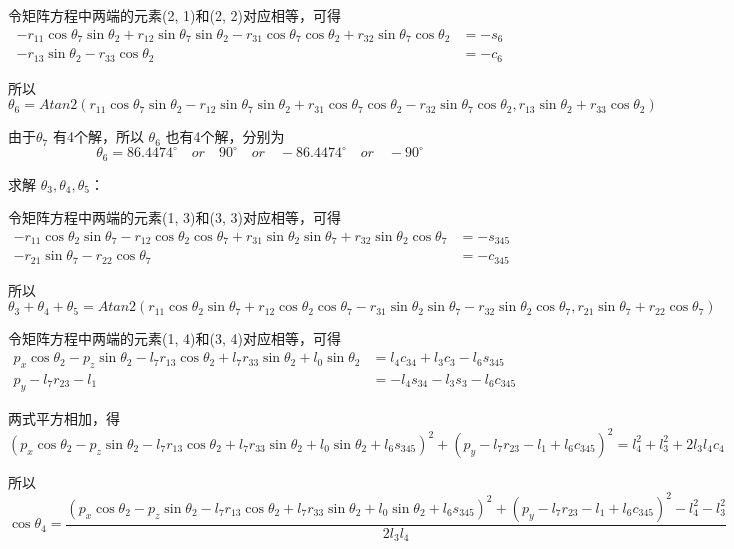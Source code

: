 \documentclass{homework}
\begin{document}
\begin{sol}
令矩阵方程中两端的元素(2, 1)和(2, 2)对应相等，可得
\begin{align*}
  -r_{11}\cos\theta_7 \sin\theta_2 + r_{12}\sin\theta_7 \sin\theta_2 - r_{31}\cos\theta_7 \cos\theta_2 + r_{32}\sin\theta_7 \cos\theta_2 &= -s_{6} \\
  -r_{13}\sin\theta_2 - r_{33}\cos\theta_2 &= -c_{6}
\end{align*} 

所以
\[
  \theta_6 = Atan2(r_{11}\cos\theta_7 \sin\theta_2 - r_{12}\sin\theta_7 \sin\theta_2 + r_{31}\cos\theta_7 \cos\theta_2 - r_{32}\sin\theta_7 \cos\theta_2, r_{13}\sin\theta_2 + r_{33}\cos\theta_2)
\]

由于$ \theta_7 $ 有4个解，所以 $ \theta_6 $ 也有4个解，分别为
\[  
  \theta_6 = 86.4474^\circ \quad or \quad 90^\circ \quad or \quad -86.4474^\circ \quad or \quad -90^\circ
\]

求解 $ \theta_3, \theta_4, \theta_5 $：

令矩阵方程中两端的元素(1, 3)和(3, 3)对应相等，可得
\begin{align*}
  -r_{11}\cos\theta_2\sin\theta_7 - r_{12}\cos\theta_2\cos\theta_7 + r_{31}\sin\theta_2\sin\theta_7 + r_{32}\sin\theta_2\cos\theta_7 &= -s_{345} \\
  -r_{21}\sin\theta_7 - r_{22}\cos\theta_7 &= -c_{345}
\end{align*} 

所以
\[
  \theta_3 + \theta_4 + \theta_5 = Atan2(r_{11}\cos\theta_2\sin\theta_7 + r_{12}\cos\theta_2\cos\theta_7 - r_{31}\sin\theta_2\sin\theta_7 - r_{32}\sin\theta_2\cos\theta_7, r_{21}\sin\theta_7 + r_{22}\cos\theta_7)
\]

令矩阵方程中两端的元素(1, 4)和(3, 4)对应相等，可得
\begin{align}
  p_x \cos\theta_2 - p_z \sin\theta_2 - l_7 r_{13} \cos\theta_2 + l_7 r_{33} \sin\theta_2 + l_0 \sin\theta_2 &= l_4 c_{34} + l_3 c_3 - l_6 s_{345} \label{eq:1_4} \\
  p_y - l_7 r_{23} - l_1 &= -l_4 s_{34} - l_3 s_3 - l_6 c_{345} \label{eq:3_4}
\end{align} 

两式平方相加，得
\[
  (p_x \cos\theta_2 - p_z \sin\theta_2 - l_7 r_{13} \cos\theta_2 + l_7 r_{33} \sin\theta_2 + l_0 \sin\theta_2 + l_6 s_{345})^2 + (p_y - l_7 r_{23} - l_1 + l_6 c_{345})^2 = l_4^2 + l_3^2 + 2 l_3 l_4 c_4
\]

所以
\[
  \cos\theta_4 = \frac{(p_x \cos\theta_2 - p_z \sin\theta_2 - l_7 r_{13} \cos\theta_2 + l_7 r_{33} \sin\theta_2 + l_0 \sin\theta_2 + l_6 s_{345})^2 + (p_y - l_7 r_{23} - l_1 + l_6 c_{345})^2 - l_4^2 - l_3^2}{2 l_3 l_4}
\]


\end{sol}
\end{document}
